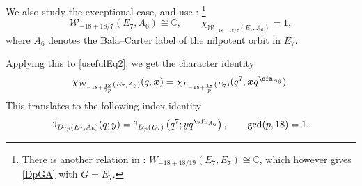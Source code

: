 \documentclass[a4paper,11pt]{article}
\theoremstyle{definition}
\theoremstyle{definition}
\theoremstyle{remark}
\newcommand{\be}{\begin{equation}}
\newcommand{\ee}{\end{equation}}
\begin{document}
 
We also study the exceptional case, and use  
 \cite[Theorem~10.6]{Arakawa:2021ogm}: 
 \footnote{There is another relation in  \cite[Theorem~10.6]{Arakawa:2021ogm}:  $W_{-18+18/19}(E_7, E_7) \cong \mathbb{C}$, which however gives   \eqref{DpGA} with $G=E_7$. }
 \be
\mathcal{W}_{-18+18/7}(E_7, A_6) \cong \mathbb{C},\qquad
\chi_{\mathcal{W}_{-18+18/7}(E_7, A_6)}=1,
\ee
where $A_6$ denotes the Bala–Carter label of the nilpotent orbit in   $E_7$.

Applying this to \eqref{usefulEq2}, we get the character identity 
  \be
\chi_{\mathcal W_{-18+\frac{18}{ 7 p }}(E_7,A_6)}(q,\bm x)
 = 
  \chi_{L_{-18+\frac{18}{p}}(E_7)}(q^7,\bm x q^{\sfh_{  A_6}}).
\ee 
This translates to  the following index identity 
\be
\mathcal{I}_{D_{7p}(E_7, A_6)}(q; y) = \mathcal{I}_{D_p(E_7)} \left(q^7; y q^{\sfh_{A_6}}\right), \qquad \gcd(p, 18) = 1.
\ee
 
 
  
\end{document}
